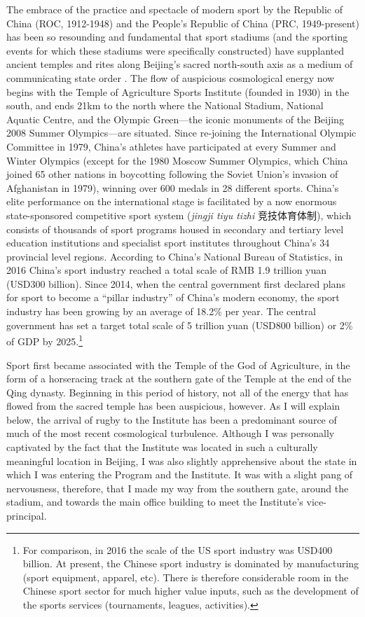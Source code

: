\begin{CJK}{UTF8}{gbsn}
The embrace of the practice and spectacle of modern sport by the Republic of China (ROC, 1912-1948) and the People's Republic of China (PRC, 1949-present) has been so resounding and fundamental that sport stadiums (and the sporting events for which these stadiums were specifically constructed) have supplanted ancient temples and rites along Beijing's sacred north-south axis as a medium of communicating state order \citep{Brownell1995}.  The flow of auspicious cosmological energy now begins with the Temple of Agriculture Sports Institute (founded in 1930) in the south, and ends 21km to the north where the National Stadium, National Aquatic Centre, and the Olympic Green---the iconic monuments of the Beijing 2008 Summer Olympics---are situated.  Since re-joining the International Olympic Committee in 1979, China's athletes have participated at every Summer and Winter Olympics (except for the 1980 Moscow Summer Olympics, which China joined 65 other nations in boycotting following the Soviet Union's invasion of Afghanistan in 1979), winning over 600 medals in 28 different sports.  China's elite performance on the international stage is facilitated by a now enormous state-sponsored competitive sport system (\textit{jingji tiyu tizhi} 竞技体育体制), which consists of thousands of sport programs housed in secondary and tertiary level education institutions and specialist sport institutes throughout China's 34 provincial level regions.  According to China's National Bureau of Statistics, in 2016 China's sport industry reached a total scale of RMB 1.9 trillion yuan (USD300 billion).  Since 2014, when the central government first declared plans for sport to become a ``pillar industry'' of China's modern economy, the sport industry has been growing by an average of 18.2\% per year.  The central government has set a target total scale of 5 trillion yuan (USD800 billion) or 2\% of GDP by 2025.\footnote{For comparison, in 2016 the scale of the US sport industry was USD400 billion. At present, the Chinese sport industry is dominated by manufacturing (sport equipment, apparel, etc).  There is therefore considerable room in the Chinese sport sector for much higher value inputs, such as the development of the sports services (tournaments, leagues, activities).}

Sport first became associated with the Temple of the God of Agriculture, in the form of a horseracing track at the southern gate of the Temple at the end of the Qing dynasty. Beginning in this period of history, not all of the energy that has flowed from the sacred temple has been auspicious, however.  As I will explain below, the arrival of rugby to the Institute has been a predominant source of much of the most recent cosmological turbulence. Although I was personally captivated by the fact that the Institute was located in such a culturally meaningful location in Beijing, I was also slightly apprehensive about the state in which I was entering the Program and the Institute.  It was with a slight pang of nervousness, therefore, that I made my way from the southern gate, around the stadium, and towards the main office building to meet the Institute's vice-principal.



\end{CJK}
